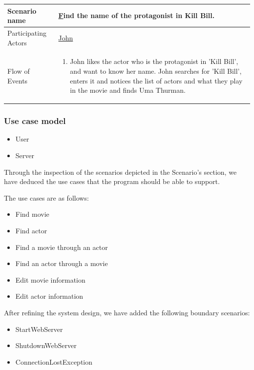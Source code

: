 \begin{center}
	\begin{tabular}{ | l | p{10cm} |  }
		 \hline
		Scenario name & \underline Find the name of the protagonist in Kill Bill.  \\ \hline
		Participating Actors & \underline{John} \\ \hline
		Flow of Events & \begin{enumerate}
						\item John likes the actor who is the protagonist in 'Kill Bill', and want to know her name.
						John searches for 'Kill Bill', enters it and notices the list of actors and what they play in the movie and finds Uma Thurman.
						\end{enumerate}
						\\ \hline
	\end{tabular}
\end{center}

\subsubsection{Use case model}

\begin{itemize}
	\setlength{\itemsep}{-5pt}
	\item User
	\item Server
\end{itemize}

Through the inspection of the scenarios depicted in the Scenario’s section, we have deduced the use cases that the program should be able to support.

The use cases are as follows:
\begin{itemize}
	\setlength{\itemsep}{-5pt}
	\item Find movie
	\item Find actor
	\item Find a movie through an actor
	\item Find an actor through a movie
	\item Edit movie information
	\item Edit actor information
\end{itemize}

After refining the system design, we have added the following boundary scenarios:
\begin{itemize}
	\setlength{\itemsep}{-5pt}
	
	\item StartWebServer
	\item ShutdownWebServer
	\item ConnectionLostException
\end{itemize}


